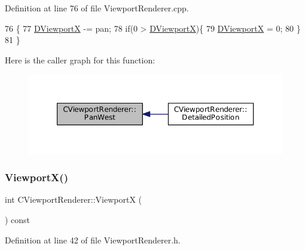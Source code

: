 Definition at line 76 of file Viewport\+Renderer.\+cpp.


\begin{DoxyCode}
76                                       \{
77     \hyperlink{classCViewportRenderer_aea9e05347f71a8e6b83439aab653be18}{DViewportX} -= pan;
78     \textcolor{keywordflow}{if}(0 > \hyperlink{classCViewportRenderer_aea9e05347f71a8e6b83439aab653be18}{DViewportX})\{
79         \hyperlink{classCViewportRenderer_aea9e05347f71a8e6b83439aab653be18}{DViewportX} = 0;
80     \}
81 \}
\end{DoxyCode}
Here is the caller graph for this function\+:
\nopagebreak
\begin{figure}[H]
\begin{center}
\leavevmode
\includegraphics[width=350pt]{classCViewportRenderer_aa09c1b984311f77ea1cdcdc74a7a0316_icgraph}
\end{center}
\end{figure}
\hypertarget{classCViewportRenderer_adf6c09ee00cdbf0803e72d59bff9a235}{}\label{classCViewportRenderer_adf6c09ee00cdbf0803e72d59bff9a235} 
\subsubsection{\texorpdfstring{Viewport\+X()}{ViewportX()}\hspace{0.1cm}{\footnotesize\ttfamily [1/2]}}
{\footnotesize\ttfamily int C\+Viewport\+Renderer\+::\+ViewportX (\begin{DoxyParamCaption}{ }\end{DoxyParamCaption}) const\hspace{0.3cm}{\ttfamily [inline]}}



Definition at line 42 of file Viewport\+Renderer.\+h.


